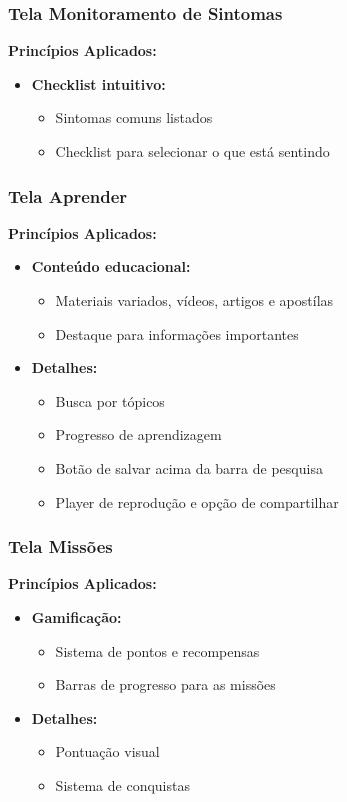 \documentclass[a5paper, 12pt]{article}
\begin{document}
\subsubsection{Tela Monitoramento de Sintomas}
\textbf{Princípios Aplicados:}
\begin{itemize}[leftmargin=*]
    \item \textbf{Checklist intuitivo:}
    \begin{itemize}
        \item Sintomas comuns listados
        \item Checklist para selecionar o que está sentindo
    \end{itemize}
\end{itemize}

\subsubsection{Tela Aprender}
\textbf{Princípios Aplicados:}
\begin{itemize}[leftmargin=*]
    \item \textbf{Conteúdo educacional:}
    \begin{itemize}
        \item Materiais variados, vídeos, artigos e apostílas
        \item Destaque para informações importantes
    \end{itemize}

    \item \textbf{Detalhes:}
    \begin{itemize}
        \item Busca por tópicos
        \item Progresso de aprendizagem
        \item Botão de salvar acima da barra de pesquisa
        \item Player de reprodução e opção de compartilhar
    \end{itemize}
\end{itemize}

\subsubsection{Tela Missões}
\textbf{Princípios Aplicados:}
\begin{itemize}[leftmargin=*]
    \item \textbf{Gamificação:}
    \begin{itemize}
        \item Sistema de pontos e recompensas
        \item Barras de progresso para as missões
    \end{itemize}
    
    \item \textbf{Detalhes:}
    \begin{itemize}
        \item Pontuação visual
        \item Sistema de conquistas
    \end{itemize}
\end{itemize}
\end{document}
